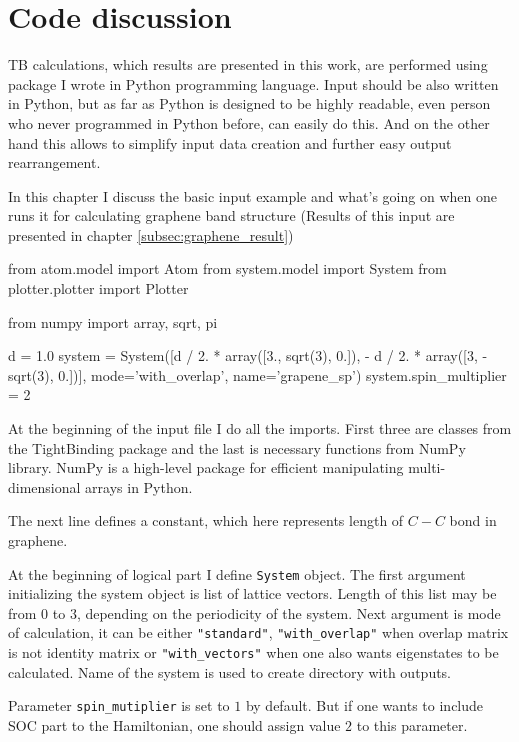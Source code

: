 \chapter{Code discussion}
TB calculations, which results are presented in this work, are performed using package I wrote in Python programming language. Input should be also written in Python, but as far as Python is designed to be highly readable, even person who never programmed in Python before, can easily do this. And on the other hand this allows to simplify input data creation and further easy output rearrangement.

In this chapter I discuss the basic input example and what's going on when one runs it for calculating graphene band structure (Results of this input are presented in chapter \ref{subsec:graphene_result})

\begin{python}
from atom.model import Atom
from system.model import System
from plotter.plotter import Plotter

from numpy import array, sqrt, pi

d = 1.0
system = System([d / 2. * array([3., sqrt(3), 0.]),
                 - d / 2. * array([3, -sqrt(3), 0.])],
                mode='with_overlap', name='grapene_sp')
system.spin_multiplier = 2
\end{python}
 
At the beginning of the input file I do all the imports. First three are classes from the TightBinding package and the last is necessary functions from NumPy library. NumPy is a high-level package for efficient manipulating multi-dimensional arrays in Python. 

The next line defines a constant, which here represents length of $C-C$ bond in graphene.

At the beginning of logical part I define \verb!System! object. The first argument initializing the system object is list of lattice vectors. Length of this list may be from $0$ to $3$, depending on the periodicity of the system. Next argument is mode of calculation, it can be either \verb!"standard"!, \verb!"with_overlap"! when overlap matrix is not identity matrix or \verb!"with_vectors"! when one also wants eigenstates to be calculated. Name of the system is used to create directory with outputs.

Parameter \verb!spin_mutiplier! is set to $1$ by default. But if one wants to include SOC part to the Hamiltonian, one should assign value $2$ to this parameter.

